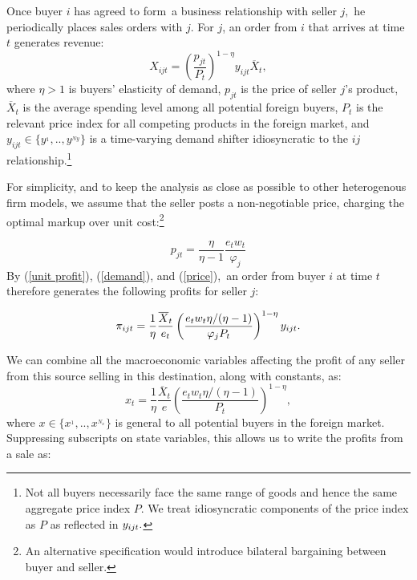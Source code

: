 \documentclass[12pt]{article}
\begin{document}
Once buyer $i$ has agreed to form\ a business relationship with seller $j,$
he periodically places sales orders with $j$. For $j$, an order from $i$
that arrives at time $t$ generates revenue:%
\begin{equation}
X_{ijt}=\left( \frac{p_{jt}}{P_{t}}\right) ^{1-\eta }y_{ijt}\overline{X}_{t},
\label{demand}
\end{equation}%
where $\eta >1$ is buyers' elasticity of demand, $p_{jt}$ is the price of
seller $j$'s product, $\overline{X}_{t}$ is the average spending level among
all potential foreign buyers, $P_{t}$ is the relevant price index for all
competing products in the foreign market, and $y_{ijt}\in
\{y^{_{1}},..,y^{_{Ny}}\}$ is a time-varying demand shifter idiosyncratic to
the $ij$ relationship.\footnote{%
Not all buyers necessarily face the same range of goods and hence the same
aggregate price index $P$. We treat idiosyncratic components of the price
index as $P$ as reflected in $y_{ijt}.\medskip $}

For simplicity, and to keep the analysis as close as possible to other
heterogenous firm models, we assume that the seller posts a non-negotiable
price, charging the optimal markup over unit cost:\footnote{%
An alternative specification would introduce bilateral bargaining between
buyer and seller.\medskip}

\begin{equation}
p_{jt}=\frac{\eta }{\eta -1}\frac{e_{t}w_{t}}{\varphi _{j}}  \label{price}
\end{equation}%
By (\ref{unit profit}), (\ref{demand}), and (\ref{price}),\ an order from
buyer $i$ at time $t$ therefore generates the following profits for seller $%
j $:

\begin{equation*}
\pi _{ijt}=\frac{1}{\eta }\frac{\overline{X}_{t}}{e_{t}}\left( \frac{%
e_{t}w_{t}\eta /(\eta -1)}{\varphi _{j}P_{t}}\right) ^{1-\eta }y_{ijt}.
\end{equation*}

We can combine all the macroeconomic variables affecting the profit of any
seller from this source selling in this destination, along with constants,
as:%
\begin{equation*}
x_{t}=\frac{1}{\eta }\frac{\overline{X}_{t}}{e}\left( \frac{e_{t}w_{t}\eta
/(\eta -1)}{P_{t}}\right) ^{1-\eta },
\end{equation*}%
where $x\in \{x^{_{1}},..,x^{_{N_{x}}}\}$ is general to all potential buyers
in the foreign market. Suppressing subscripts on state variables, this
allows us to write the profits from a sale as:
\end{document}

